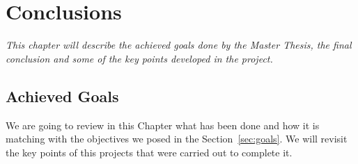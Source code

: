 \chapter{Conclusions}
\label{chap:conclusions}
\textit{This chapter will describe the achieved goals done by the Master Thesis, the final conclusion and some of the key points developed in the project.}

\clearpage
\section{Achieved Goals}
We are going to review in this Chapter what has been done and how it is matching with the objectives we posed in the Section~\ref{sec:goals}. We will revisit the key points of this projects that were carried out to complete it.

